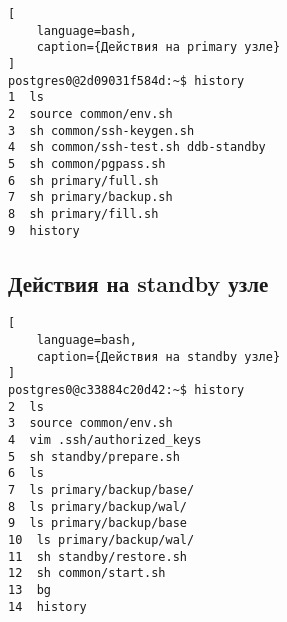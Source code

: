 \documentclass{article}
\begin{document}
\begin{lstlisting}[
    language=bash,
    caption={Действия на primary узле}
]
postgres0@2d09031f584d:~$ history
1  ls
2  source common/env.sh 
3  sh common/ssh-keygen.sh 
4  sh common/ssh-test.sh ddb-standby
5  sh common/pgpass.sh 
6  sh primary/full.sh 
7  sh primary/backup.sh 
8  sh primary/fill.sh 
9  history
\end{lstlisting}

\subsection{Действия на standby узле}

\begin{lstlisting}[
    language=bash,
    caption={Действия на standby узле}
]
postgres0@c33884c20d42:~$ history
2  ls
3  source common/env.sh
4  vim .ssh/authorized_keys 
5  sh standby/prepare.sh 
6  ls
7  ls primary/backup/base/
8  ls primary/backup/wal/
9  ls primary/backup/base
10  ls primary/backup/wal/
11  sh standby/restore.sh 
12  sh common/start.sh 
13  bg
14  history
\end{lstlisting}
\end{document}
